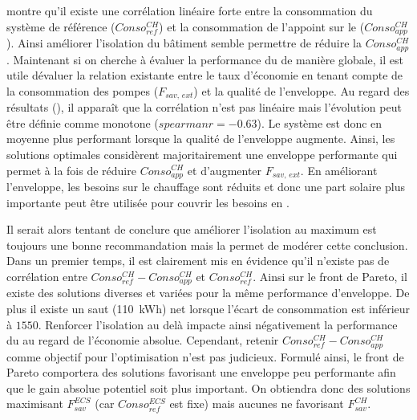  montre qu’il existe une corrélation linéaire forte entre la
consommation du système de référence ($Conso_{ref}^{CH}$) et la consommation de l’appoint sur
le  ($Conso_{app}^{CH}$). Ainsi améliorer l’isolation du bâtiment semble permettre
de réduire la $Conso_{app}^{CH}$. Maintenant si on cherche à évaluer la performance du
 de manière globale, il est utile dévaluer la relation existante entre
le taux d’économie en tenant compte de la consommation des pompes ($F_{sav,\,ext}$)
et la qualité de l’enveloppe. Au regard des résultats (),
il apparaît que la corrélation n’est pas linéaire mais l’évolution peut être définie
comme monotone ($spearmanr = \num{-0.63}$). Le système est donc en moyenne plus performant
lorsque la qualité de l’enveloppe augmente. Ainsi, les solutions optimales
considèrent majoritairement une enveloppe performante qui permet à la fois de réduire
$Conso_{app}^{CH}$ et d’augmenter $F_{sav,\,ext}$. En améliorant l’enveloppe, les besoins
sur le chauffage sont réduits et donc une part solaire plus importante peut être
utilisée pour couvrir les besoins en .

Il serait alors tentant de conclure que améliorer l’isolation au maximum est
toujours une bonne recommandation mais la  permet
de modérer cette conclusion. Dans un premier temps, il est clairement mis en évidence
qu’il n’existe pas de corrélation entre $Conso_{ref}^{CH} - Conso_{app}^{CH}$ et
$Conso_{ref}^{CH}$. Ainsi sur le front de Pareto, il existe des solutions diverses
et variées pour la même performance d’enveloppe. De plus il existe un saut (\SI{110}{kWh})
net lorsque l’écart de consommation est inférieur à $1550$. Renforcer l’isolation
au delà impacte ainsi négativement la performance du  au regard de l’économie
absolue. Cependant, retenir $Conso_{ref}^{CH} - Conso_{app}^{CH}$ comme objectif
pour l’optimisation n’est pas judicieux. Formulé ainsi, le front de Pareto
comportera des solutions favorisant une enveloppe peu performante afin que le gain
absolue potentiel soit plus important. On obtiendra donc des solutions
maximisant $F_{sav}^{ECS}$ (car $Conso_{ref}^{ECS}$ est fixe) mais aucunes ne
favorisant $F_{sav}^{CH}$.


